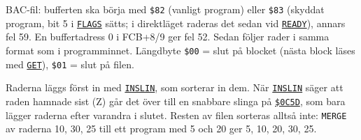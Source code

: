 \begin{Listing}
\Gap
{}
\Gap
\begin{Cmt}\par\noindent BAC-fil: bufferten ska börja med \texttt{\$82} (vanligt program) eller \texttt{\$83} (skyddat program, bit 5 i \hyperlink{v:FLAGS}{\texttt{FLAGS}} sätts; i direktläget raderas det sedan vid \hyperlink{l:READY}{\texttt{READY}}), annars fel 59. En buffertadress 0 i FCB+8/9 ger fel 52. Sedan följer rader i samma format som i programminnet. Längdbyte \texttt{\$00} = slut på blocket (nästa block läses med \hyperlink{l:GET}{\texttt{GET}}), \texttt{\$01} = slut på filen.\par
\par\noindent Raderna läggs först in med \hyperlink{l:INSLIN}{\texttt{INSLIN}}, som sorterar in dem. När \hyperlink{l:INSLIN}{\texttt{INSLIN}} säger att raden hamnade sist (Z) går det över till en snabbare slinga på \hyperlink{a:0C5D}{\texttt{\$0C5D}}, som bara lägger raderna efter varandra i slutet. Resten av filen sorteras alltså inte: \texttt{MERGE} av raderna 10, 30, 25 till ett program med 5 och 20 ger 5, 10, 20, 30, 25.\par\end{Cmt}

\end{Listing}
